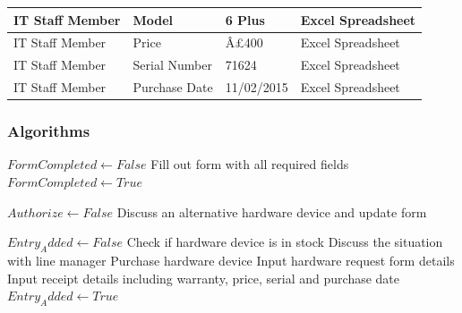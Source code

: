 \begin{table}[H]
{\begin{tabular}{|p{4cm}|p{5.3cm}|p{8cm}|p{3cm}|}
IT Staff Member                             & Model                              & 6 Plus                                             & Excel Spreadsheet                                       \\ \hline
IT Staff Member                       & Price                              & Â£400                                               & Excel Spreadsheet        \\ \hline
IT Staff Member                       & Serial Number                      & 71624                                          &  Excel Spreadsheet           \\ \hline
IT Staff Member                       & Purchase Date                      & 11/02/2015                                         &  Excel Spreadsheet           \\ \hline
\end{tabular}
}
\end{table}

\subsubsection{Algorithms}

\begin{algorithm}[H]
\begin{algorithmic}
\State $FormCompleted  \leftarrow False$
	\State Fill out form with all required fields
	\State $FormCompleted \leftarrow True$
\Else
\EndIf
\end{algorithmic}
\end{algorithm}

\begin{algorithm}[H]
\begin{algorithmic}
\State$Authorize \leftarrow False$
		\State Discuss an alternative hardware device and update form
	\Else
	\EndIf
\EndWhile
\end{algorithmic}
\end{algorithm}


\begin{algorithm}[H]
\begin{algorithmic}
\State $Entry_Added \leftarrow False$
	\State Check if hardware device is in stock
		\State Discuss the situation with line manager
	\Else
		\State Purchase hardware device
		\State Input hardware request form details
		\State Input receipt details including warranty, price, serial and purchase date
		\State $Entry_Added \leftarrow True$
	\EndIf
\EndWhile
\end{algorithmic}
\end{algorithm}
		

